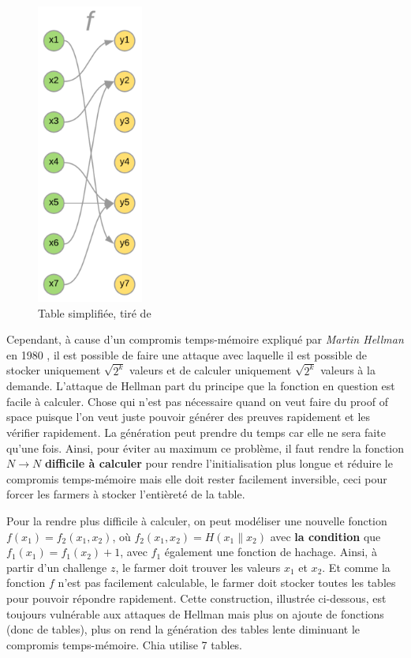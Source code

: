 \begin{figure}[H]
  \centering
  \includegraphics[width=3.5cm]{images/pospace_1.png}
  \caption{Table simplifiée, tiré de \cite{chia:construction}}
\end{figure}

Cependant, à cause d'un compromis temps-mémoire expliqué par \emph{Martin Hellman} en 1980 \cite{DBLP:journals/tit/Hellman80}, il est possible de faire une attaque avec laquelle il est possible de stocker uniquement $\sqrt{2^k}$ valeurs et de calculer uniquement $\sqrt{2^k}$ valeurs à la demande. L'attaque de Hellman part du principe que la fonction en question est facile à calculer. Chose qui n'est pas nécessaire quand on veut faire du proof of space puisque l'on veut juste pouvoir générer des preuves rapidement et les vérifier rapidement. La génération peut prendre du temps car elle ne sera faite qu'une fois. Ainsi, pour éviter au maximum ce problème, il faut rendre la fonction $N \rightarrow N$ \textbf{difficile à calculer} pour rendre l'initialisation plus longue et réduire le compromis temps-mémoire mais elle doit rester facilement inversible, ceci pour forcer les farmers à stocker l'entièreté de la table.

Pour la rendre plus difficile à calculer, on peut modéliser une nouvelle fonction $f(x_1)=f_2(x_1,x_2)$, où $f_2(x_1,x_2)=H(x_1\|x_2)$ avec \textbf{la condition} que $f_1(x_1)=f_1(x_2)+1$, avec $f_1$ également une fonction de hachage. Ainsi, à partir d'un challenge $z$, le farmer doit trouver les valeurs $x_1$ et $x_2$. Et comme la fonction $f$ n'est pas facilement calculable, le farmer doit stocker toutes les tables pour pouvoir répondre rapidement. Cette construction, illustrée ci-dessous, est toujours vulnérable aux attaques de Hellman mais plus on ajoute de fonctions (donc de tables), plus on rend la génération des tables lente diminuant le compromis temps-mémoire. Chia utilise 7 tables.

